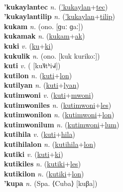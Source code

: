  \label{'kukaylanwon} \\
\textbf{'kukaylantec} \textit{n.} (\hyperref['kukaylan]{'kukaylan}+\hyperref[tec]{tec})
 \label{'kukaylantec} \\
\textbf{'kukaylantilip} \textit{n.} (\hyperref['kukaylan]{'kukaylan}+\hyperref[tilip]{tilip})
 \label{'kukaylantilip} \\
\textbf{kukam} \textit{n.} (ono. [ɡuː ɡaː])
 \label{kukam} \\
\textbf{kukamak} \textit{n.} (\hyperref[kukam]{kukam}+\hyperref[ak]{ak})
 \label{kukamak} \\
\textbf{kuki} \textit{v.} (\hyperref[ku]{ku}+\hyperref[ki]{ki})
 \label{kuki} \\
\textbf{kukulik} \textit{n.} (ono. [kuk kurikoː])
 \label{kukulik} \\
\textbf{kuti} \textit{v.} ( [ku˥˩tʰi˧˩˧])
 \label{kuti} \\
\textbf{kutilon} \textit{n.} (\hyperref[kuti]{kuti}+\hyperref[lon]{lon})
 \label{kutilon} \\
\textbf{kutilyan} \textit{n.} (\hyperref[kuti]{kuti}+\hyperref[lyan]{lyan})
 \label{kutilyan} \\
\textbf{kutimwoni} \textit{v.} (\hyperref[kuti]{kuti}+\hyperref[mwoni]{mwoni})
 \label{kutimwoni} \\
\textbf{kutimwoniles} \textit{n.} (\hyperref[kutimwoni]{kutimwoni}+\hyperref[les]{les})
 \label{kutimwoniles} \\
\textbf{kutimwonilon} \textit{n.} (\hyperref[kutimwoni]{kutimwoni}+\hyperref[lon]{lon})
 \label{kutimwonilon} \\
\textbf{kutimwonilum} \textit{n.} (\hyperref[kutimwoni]{kutimwoni}+\hyperref[lum]{lum})
 \label{kutimwonilum} \\
\textbf{kutihila} \textit{v.} (\hyperref[kuti]{kuti}+\hyperref[hila]{hila})
 \label{kutihila} \\
\textbf{kutihilalon} \textit{n.} (\hyperref[kutihila]{kutihila}+\hyperref[lon]{lon})
 \label{kutihilalon} \\
\textbf{kutiki} \textit{v.} (\hyperref[kuti]{kuti}+\hyperref[ki]{ki})
 \label{kutiki} \\
\textbf{kutikiles} \textit{n.} (\hyperref[kutiki]{kutiki}+\hyperref[les]{les})
 \label{kutikiles} \\
\textbf{kutikilon} \textit{n.} (\hyperref[kutiki]{kutiki}+\hyperref[lon]{lon})
 \label{kutikilon} \\
\textbf{'kupa} \textit{n.} (Spa. ⟨Cuba⟩ [kuβa])
 \label{'kupa} \\
